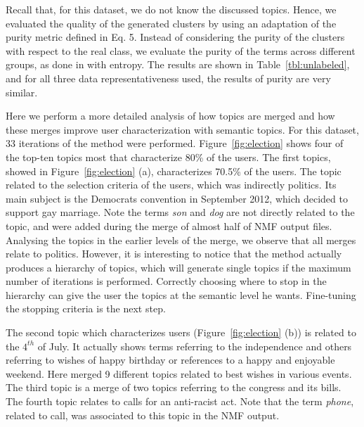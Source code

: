 Recall that, for this dataset, we do not know the discussed topics. Hence, we evaluated the quality of the generated clusters by using an adaptation of the purity metric defined in Eq. 5. Instead of considering the purity of the clusters with respect to the real class, we evaluate the purity of the terms across different groups, as done in \cite{kao2004mining} with entropy.
The results are shown in Table~\ref{tbl:unlabeled}, and for all three data representativeness used, the results of purity are very similar.

Here we perform a more detailed analysis of how topics are merged and how these merges improve user characterization with semantic topics. For this dataset, 33 iterations of the method were performed. Figure~\ref{fig:election} shows four of the top-ten topics most that characterize 80\% of the users.
The first topics, showed in Figure~\ref{fig:election} (a), characterizes 70.5\% of the users. The topic related to the selection criteria of the users, which was indirectly politics. Its main subject is the Democrats convention in September 2012, which decided to support gay marriage. Note the terms \textit{son} and \textit{dog} are not directly related to the topic, and were added during the merge of almost half of NMF output files. 
Analysing the topics in the earlier levels of the merge, we observe that all merges relate to politics. However, it is interesting to notice that the method actually produces a hierarchy of topics, which will generate single topics if the maximum number of iterations is performed. Correctly choosing where to stop in the hierarchy can give the user the topics at the semantic level he wants. Fine-tuning the stopping criteria is the next step.

The second topic which characterizes users (Figure~\ref{fig:election} (b)) is related to the $4^{th}$ of July. It actually shows terms referring to the independence and others referring to wishes of happy birthday or references to a happy and enjoyable weekend. Here \method merged 9 different topics related to best wishes in various events. The third topic is a merge of two topics referring to the congress and its bills. The fourth topic relates to calls for an anti-racist act. Note that the term \textit{phone}, related to call, was associated to this topic in the NMF output.


%






